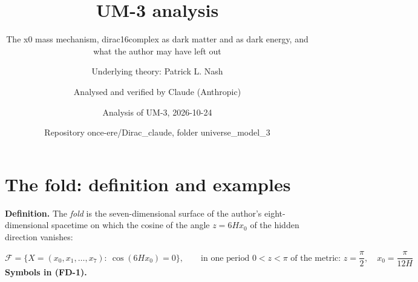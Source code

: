 \documentclass[
  10pt,
]{article}
\title{UM-3 analysis}
\subtitle{The x0 mass mechanism, dirac16complex as dark matter and as
dark energy, and what the author may have left out}
\author{Underlying theory: Patrick L. Nash \and Analysed and verified by
Claude (Anthropic) \and Analysis of UM-3, 2026-10-24 \and Repository
once-ere/Dirac\_claude, folder universe\_model\_3}
\date{}
\begin{document}
\maketitle

{
\hypersetup{linkcolor=}
\setcounter{tocdepth}{3}
\tableofcontents
}
\hypertarget{the-fold-definition-and-examples}{%
\section{The fold: definition and
examples}\label{the-fold-definition-and-examples}}

\textbf{Definition.} The \emph{fold} is the seven-dimensional surface of
the author's eight-dimensional spacetime on which the cosine of the
angle \(z = 6Hx_0\) of the hidden direction vanishes:

\[
\mathcal{F} = \big\{X = (x_0, x_1, \dots, x_7):\ \cos(6Hx_0) = 0\big\},\qquad
\text{in one period } 0 < z < \pi\text{ of the metric: } z = \frac{\pi}{2},\quad x_0 = \frac{\pi}{12H} \tag{FD-1}
\] \textbf{Symbols in (FD-1).}
\end{document}
